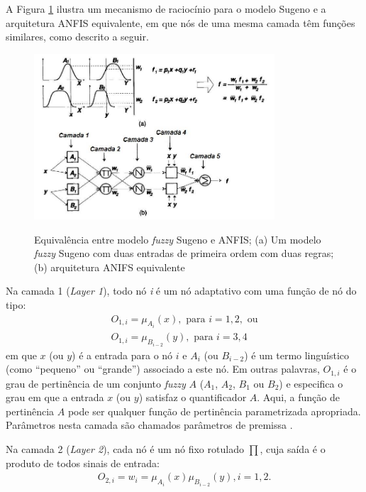 A Figura \ref{fig:anfis} ilustra um mecanismo de raciocínio para o modelo Sugeno e a arquitetura ANFIS equivalente, em que nós de uma mesma camada têm funções similares, como descrito a seguir.
\begin{figure}[!htb]
    \centering
    \caption{Equivalência entre modelo \textit{fuzzy} Sugeno e ANFIS; (a) Um modelo \textit{fuzzy} Sugeno com duas entradas de primeira ordem com duas regras; (b) arquitetura ANIFS equivalente}
    \includegraphics[width=0.8\textwidth]{./04-figuras/fund_teorica/anfis_traduzido}
    \label{fig:anfis}
\end{figure}

Na camada 1 (\textit{Layer 1}), todo nó \textit{i} é um nó adaptativo com uma função de nó do tipo:
\begin{align*}
    O_{1,i} = \mu_{A_{i}}(x), \mbox{ para } i = 1, 2, \mbox{ ou}\\
    O_{1,i} = \mu_{B_{i-2}}(y), \mbox{ para } i = 3, 4
\end{align*}
em que $x$ (ou $y$) é a entrada para o nó $i$ e $A_{i}$ (ou $B_{i-2}$) é um termo linguístico (como ``pequeno'' ou ``grande'') associado a este nó. Em outras palavras, $O_{1,i}$ é o grau de pertinência de um conjunto \textit{fuzzy} $A$ ($A_1$, $A_2$, $B_1$ ou $B_2$) e especifica o grau em que a entrada $x$ (ou $y$) satisfaz o quantificador $A$. Aqui, a função de pertinência $A$ pode ser qualquer função de pertinência parametrizada apropriada. Parâmetros nesta camada são chamados parâmetros de premissa \cite[p.~336]{Jang1997}.

Na camada 2 (\textit{Layer 2}), cada nó é um nó fixo rotulado $\prod$, cuja saída é o produto de todos sinais de entrada:
\begin{align*}
    O_{2,i} = w_i = \mu_{A_{i}}(x)\mu_{B_{i-2}}(y), i = 1, 2.
\end{align*}

